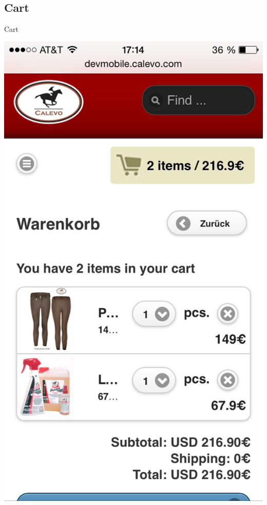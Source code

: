 \subsection{Cart}
\begin{frame}[plain]{Cart}
\begin{center}
  \includegraphics[width=\textwidth,height=1\textheight,keepaspectratio]{pics/cart.png}
\end{center}
\end{frame}

